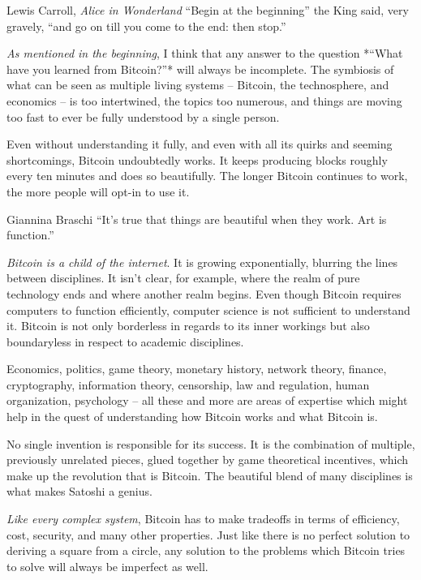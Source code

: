 \label{ch:conclusion}

\begin{chapquote}{Lewis Carroll, \textit{Alice in Wonderland}}
``Begin at the beginning'' the King said, very gravely, ``and go on till you
come to the end: then stop.''
\end{chapquote}

\textit{As mentioned in the beginning}, I think that any answer to the
question *“What have you learned from Bitcoin?”* will always be incomplete. The
symbiosis of what can be seen as multiple living systems -- Bitcoin, the
technosphere, and economics -- is too intertwined, the topics too numerous, and
things are moving too fast to ever be fully understood by a single person.

Even without understanding it fully, and even with all its quirks and seeming
shortcomings, Bitcoin undoubtedly works. It keeps producing blocks roughly every
ten minutes and does so beautifully. The longer Bitcoin continues to work, the
more people will opt-in to use it.

\begin{chapquote}{Giannina Braschi}
``It's true that things are beautiful when they work. Art is function.''
\end{chapquote}

\textit{Bitcoin is a child of the internet}. It is growing exponentially,
blurring the lines between disciplines. It isn’t clear, for example, where the
realm of pure technology ends and where another realm begins. Even though
Bitcoin requires computers to function efficiently, computer science is not
sufficient to understand it. Bitcoin is not only borderless in regards to its
inner workings but also boundaryless in respect to academic disciplines.

Economics, politics, game theory, monetary history, network theory, finance,
cryptography, information theory, censorship, law and regulation, human
organization, psychology -- all these and more are areas of expertise which might
help in the quest of understanding how Bitcoin works and what Bitcoin is.

No single invention is responsible for its success. It is the combination of
multiple, previously unrelated pieces, glued together by game theoretical
incentives, which make up the revolution that is Bitcoin. The beautiful blend of
many disciplines is what makes Satoshi a genius.

\textit{Like every complex system}, Bitcoin has to make tradeoffs in terms
of efficiency, cost, security, and many other properties. Just like there is no
perfect solution to deriving a square from a circle, any solution to the
problems which Bitcoin tries to solve will always be imperfect as well.

